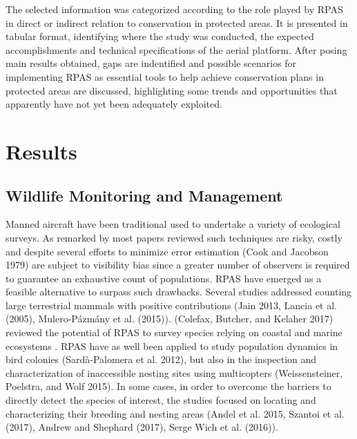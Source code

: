 \documentclass[]{interact}
\theoremstyle{plain}%
\theoremstyle{definition}
\theoremstyle{remark}
\begin{document}
The selected information was categorized according to the role played by
RPAS in direct or indirect relation to conservation in protected areas.
It is presented in tabular format, identifying where the study was
conducted, the expected accomplishments and technical specifications of
the aerial platform. After posing main results obtained, gaps are
indentified and possible scenarios for implementing RPAS as essential
tools to help achieve conservation plans in protected areas are
discussed, highlighting some trends and opportunities that apparently
have not yet been adequately exploited.

\section{Results}\label{results}

\subsection{Wildlife Monitoring and
Management}\label{wildlife-monitoring-and-management}

Manned aircraft have been traditional used to undertake a variety of
ecological surveys. As remarked by most papers reviewed such techniques
are risky, costly and despite several efforts to minimize error
estimation (Cook and Jacobson 1979) are subject to visibility bias since
a greater number of observers is required to guarantee an exhaustive
count of populations. RPAS have emerged as a feasible alternative to
surpass such drawbacks. Several studies addressed counting large
terrestrial mammals with positive contributions (Jain 2013, Lancia et
al. (2005), Mulero-Pázmány et al. (2015)). (Colefax, Butcher, and
Kelaher 2017) reviewed the potential of RPAS to survey species relying
on coastal and marine ecosystems . RPAS have as well been applied to
study population dynamics in bird colonies (Sardà-Palomera et al. 2012),
but also in the inspection and characterization of inaccessible nesting
sites using multicopters (Weissensteiner, Poelstra, and Wolf 2015). In
some cases, in order to overcome the barriers to directly detect the
species of interest, the studies focused on locating and characterizing
their breeding and nesting areas (Andel et al. 2015, Szantoi et al.
(2017), Andrew and Shephard (2017), Serge Wich et al. (2016)).
\end{document}
